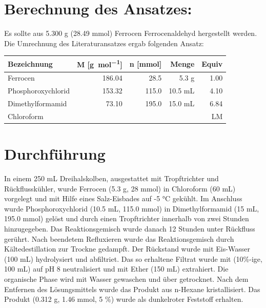\documentclass[12pt]{article}
\begin{document}
\begin{onehalfspace}

\section{Berechnung des Ansatzes: }
Es sollte aus 5.300 g (28.49 \si{\milli\mol}) Ferrocen Ferrocenaldehyd hergestellt werden.
Die Umrechnung des Literaturansatzes\cite{bio} ergab folgenden Ansatz:\\[0.5cm]
\begin{tabularx}{\textwidth}{lrrrr}
\toprule
\textbf{Bezeichnung}&\textbf{ M [\si{\gram\per\mol}]} & \textbf{n [\si{\milli\mol}]} & \textbf{Menge} & \textbf{Equiv}\\
\midrule
Ferrocen & 186.04 & 28.5  &  5.3 \si{\gram} &1.00   \\
Phosphoroxychlorid  & 153.32 & 115.0  & 10.5 \si{\milli\liter} & 4.10   \\
Dimethylformamid     & 73.10  & 195.0  & 15.0 \si{\milli\liter} & 6.84   \\
Chloroform     &  &  &  & LM   \\
\bottomrule
\end{tabularx}

\normalsize \section{Durchführung \cite{bio}}
In einem 250 \si{\milli\liter} Dreihalskolben, ausgestattet mit Tropftrichter und Rückflusskühler, wurde Ferrocen (5.3 g, 28 \si{\milli\mol}) in Chloroform (60 \si{\milli\liter}) vorgelegt und mit Hilfe eines Salz-Eisbades auf -5 \si{\celsius} gekühlt. Im Anschluss wurde Phosphoroxychlorid (10.5 \si{\milli\liter}, 115.0 \si{\milli\mol}) in Dimethylformamid (15 \si{\milli\liter}, 195.0 \si{\milli\mol}) gelöst und durch einen Tropftrichter innerhalb von zwei Stunden  hinzugegeben. Das Reaktionsgemisch wurde danach 12 Stunden unter Rückfluss gerührt. Nach beendetem Refluxieren wurde das Reaktionsgemisch durch Kältedestillation zur Trockne gedampft. Der Rückstand wurde mit Eis-Wasser (100 \si{\milli\liter}) hydrolysiert und abfiltriet. Das so erhaltene Filtrat wurde mit  (10\%-ige, 100 \si{\milli\liter}) auf pH 8 neutralisiert und mit Ether (150 \si{\milli\liter}) extrahiert. Die organische Phase wird mit Wasser gewaschen und über  getrocknet. Nach dem Entfernen des Lösungsmittels wurde das Produkt aus n-Hexane kristallisiert. Das Produkt (0.312 \si{\gram}, 1.46 \si{\milli\mol}, 5 \%) wurde als dunkelroter Feststoff erhalten.


\end{onehalfspace}
\end{document}
